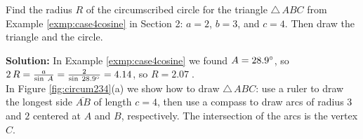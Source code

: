 \begin{exmp}
 Find the radius $R$ of the circumscribed circle for the triangle $\triangle\,ABC$ from Example
 \ref{exmp:case4cosine} in Section 2: $a = 2$, $b = 3$, and $c = 4$. Then draw the triangle and
 the circle.\vspace{1mm}
 \par\noindent\textbf{Solution:} In Example \ref{exmp:case4cosine} we found $A=28.9^\circ$, so
 $2\,R = \frac{a}{\sin\;A} = \frac{2}{\sin\;28.9^\circ} = 4.14$, so
 $\boxed{R = 2.07}\;$.\vspace{1mm}\\In Figure \ref{fig:circum234}(a) we show how to draw
 $\triangle\,ABC$: use a ruler to draw the longest side $\overline{AB}$ of length $c=4$, then use a
 compass to draw arcs of radius $3$ and $2$ centered at $A$ and $B$, respectively. The intersection
 of the arcs is the vertex $C$.\vspace{-2mm}


\end{exmp}

